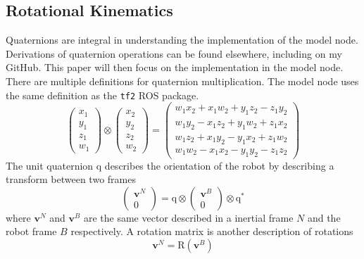 \documentclass[lettersize,journal]{IEEEtran}
\begin{document}
\subsection{Rotational Kinematics}
Quaternions are integral in understanding the implementation of the model node.
Derivations of quaternion operations can be found elsewhere, including on my GitHub.
This paper will then focus on the implementation in the model node.
There are multiple definitions for quaternion multiplication.
The model node uses the same definition as the \texttt{tf2} ROS package.
\begin{equation}
  \begin{pmatrix}
    x_1 \\
    y_1 \\
    z_1 \\
    w_1
  \end{pmatrix} \otimes
  \begin{pmatrix}
    x_2 \\
    y_2 \\
    z_2 \\
    w_2
  \end{pmatrix} =
  \begin{pmatrix}
    w_1x_2 + x_1w_2 + y_1z_2 - z_1y_2 \\
    w_1y_2 - x_1z_2 + y_1w_2 + z_1x_2 \\
    w_1z_2 + x_1y_2 - y_1x_2 + z_1w_2 \\
    w_1w_2 - x_1x_2 - y_1y_2 - z_1z_2
  \end{pmatrix}
\end{equation}
The unit quaternion $\mathrm{q}$ describes the orientation of the robot by describing a transform between two frames
\begin{equation}
  \begin{pmatrix}    
    \mathbf{v}^N \\
    0
  \end{pmatrix}
  = \mathrm{q} \otimes
  \begin{pmatrix}
    \mathbf{v}^B \\
    0
  \end{pmatrix}\otimes
  \mathrm{q}^*
\end{equation}
where $\mathbf{v}^N$ and $\mathbf{v}^B$ are the same vector described in a inertial frame $N$ and the robot frame $B$ respectively.
A rotation matrix is another description of rotations
\begin{equation}
  \mathbf{v}^N = \mathrm{R}\left(\mathbf{v}^B\right)
\end{equation}
\end{document}

